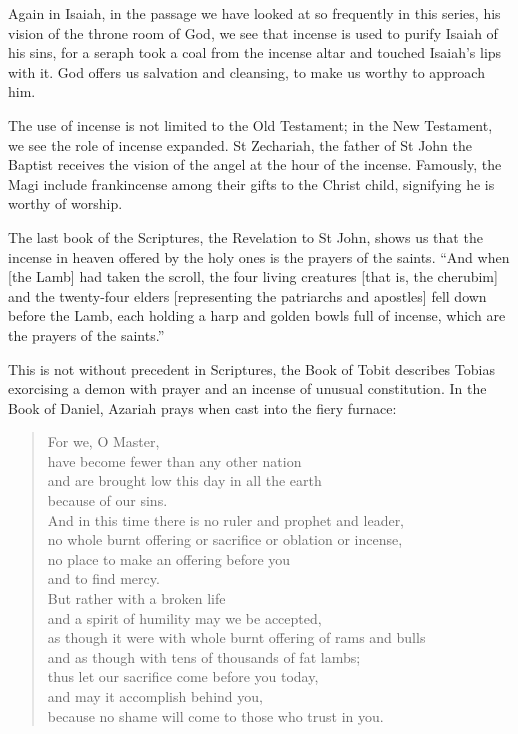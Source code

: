 \documentclass[
]{article}
\begin{document}
Again in Isaiah, in the passage we have looked at so frequently in this
series, his vision of the throne room of God, we see that incense is
used to purify Isaiah of his sins, for a seraph took a coal from the
incense altar and touched Isaiah's lips with it. God offers us salvation
and cleansing, to make us worthy to approach him.

The use of incense is not limited to the Old Testament; in the New
Testament, we see the role of incense expanded. St Zechariah, the father
of St John the Baptist receives the vision of the angel at the hour of
the incense. Famously, the Magi include frankincense among their gifts
to the Christ child, signifying he is worthy of worship.

The last book of the Scriptures, the Revelation to St John, shows us
that the incense in heaven offered by the holy ones is the prayers of
the saints. ``And when {[}the Lamb{]} had taken the scroll, the four
living creatures {[}that is, the cherubim{]} and the twenty-four elders
{[}representing the patriarchs and apostles{]} fell down before the
Lamb, each holding a harp and golden bowls full of incense, which are
the prayers of the saints.''

This is not without precedent in Scriptures, the Book of Tobit describes
Tobias exorcising a demon with prayer and an incense of unusual
constitution. In the Book of Daniel, Azariah prays when cast into the
fiery furnace:

\begin{quote}
For we, O Master,\\
have become fewer than any other nation\\
and are brought low this day in all the earth\\
because of our sins.\\
And in this time there is no ruler and prophet and leader,\\
no whole burnt offering or sacrifice or oblation or incense,\\
no place to make an offering before you\\
and to find mercy.\\
But rather with a broken life\\
and a spirit of humility may we be accepted,\\
as though it were with whole burnt offering of rams and bulls\\
and as though with tens of thousands of fat lambs;\\
thus let our sacrifice come before you today,\\
and may it accomplish behind you,\\
because no shame will come to those who trust in you.
\end{quote}
\end{document}
